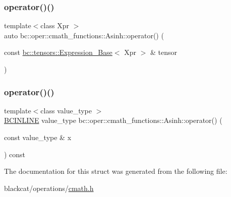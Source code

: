 \mbox{\label{structbc_1_1oper_1_1cmath__functions_1_1Asinh_af1edd2d7145261551a34401ec4a6c14d}} 
\subsubsection{\texorpdfstring{operator()()}{operator()()}\hspace{0.1cm}{\footnotesize\ttfamily [2/3]}}
{\footnotesize\ttfamily template$<$class Xpr $>$ \\
auto bc\+::oper\+::cmath\+\_\+functions\+::\+Asinh\+::operator() (\begin{DoxyParamCaption}\item[{const \hyperlink{classbc_1_1tensors_1_1Expression__Base}{bc\+::tensors\+::\+Expression\+\_\+\+Base}$<$ Xpr $>$ \&}]{tensor }\end{DoxyParamCaption})\hspace{0.3cm}{\ttfamily [inline]}}

\mbox{\label{structbc_1_1oper_1_1cmath__functions_1_1Asinh_ab6227d0033e0c9c447e17e8bfa4093d5}} 
\subsubsection{\texorpdfstring{operator()()}{operator()()}\hspace{0.1cm}{\footnotesize\ttfamily [3/3]}}
{\footnotesize\ttfamily template$<$class value\+\_\+type $>$ \\
\hyperlink{common_8h_a6699e8b0449da5c0fafb878e59c1d4b1}{B\+C\+I\+N\+L\+I\+NE} value\+\_\+type bc\+::oper\+::cmath\+\_\+functions\+::\+Asinh\+::operator() (\begin{DoxyParamCaption}\item[{const value\+\_\+type \&}]{x }\end{DoxyParamCaption}) const\hspace{0.3cm}{\ttfamily [inline]}}



The documentation for this struct was generated from the following file\+:\begin{DoxyCompactItemize}
\item 
blackcat/operations/\hyperlink{cmath_8h}{cmath.\+h}\end{DoxyCompactItemize}
